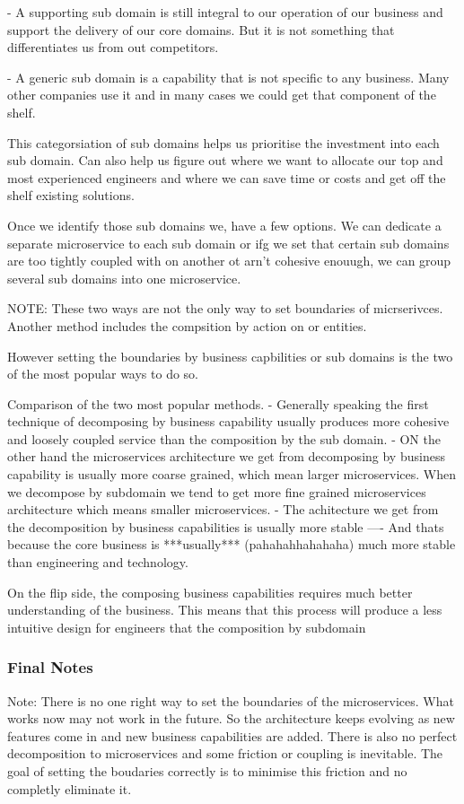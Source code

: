 \documentclass[a4paper, 11pt]{book}
\begin{document}
    - A supporting sub domain is still integral to our operation of our business and support the delivery of our core domains.
    But it is not something that differentiates us from out competitors.

    - A generic sub domain is a capability that is not specific to any business.
    Many other companies use it and in many cases we could get that component of the shelf.

    This categorsiation of sub domains helps us prioritise the investment into each sub domain.
    Can also help us figure out where we want to allocate our top and most experienced engineers and where we can save time or costs and get off the shelf existing solutions.

    Once we identify those sub domains we, have a few options.
    We can dedicate a separate microservice to each sub domain or ifg we set that certain sub domains are too tightly coupled with on another ot arn't cohesive enouugh, we can group several sub domains into one microservice.

    NOTE: These two ways are not the only way to set boundaries of micrserivces.
    Another method includes the compsition by action on or entities.

    However setting the boundaries by business capbilities or sub domains is the two of the most popular ways to do so.

    Comparison of the two most popular methods.
    - Generally speaking the first technique of decomposing by business capability usually produces more cohesive and loosely coupled service than the composition by the sub domain.
    - ON the other hand the microservices architecture we get from decomposing by business capability is usually more coarse grained, which mean larger microservices.
    When we decompose by subdomain we tend to get more fine grained microservices architecture which means smaller microservices.
    - The achitecture we get from the decomposition by business capabilities is usually more stable
    ---- And thats because the core business is ***usually*** (pahahahhahahaha) much more stable than engineering and technology.

    On the flip side, the composing business capabilities requires much better understanding of the business.
    This means that this process will produce a less intuitive design for engineers that the composition by subdomain

    \subsubsection{Final Notes}
    Note: There is no one right way to set the boundaries of the microservices. What works now may not work in the future.
    So the architecture keeps evolving as new features come in and new business capabilities are added.
    There is also no perfect decomposition to microservices and some friction or coupling is inevitable.
    The goal of setting the boudaries correctly is to minimise this friction and no completly eliminate it.
\end{document}
